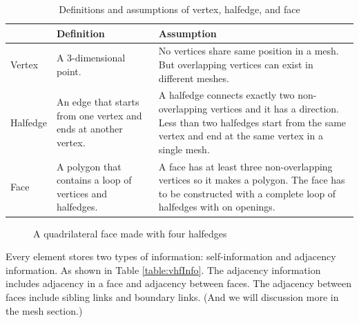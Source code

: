 \documentclass[12pt]{article}
\begin{document}
\begin{table}[h]
\centering
\begin{tabular}{| l | p{} | p{}|}

\hline
    & Definition  & Assumption  \\
\hline
Vertex  & A 3-dimensional point.    & No vertices share same position in a mesh. But overlapping vertices can exist in different meshes.\\
\hline
Halfedge  & An edge that starts from one vertex and ends at another vertex. & A halfedge connects exactly two non-overlapping vertices and it has a direction. 
Less than two halfedges start from the same vertex and end at the same vertex in a single mesh.\\
\hline
Face    & A polygon that contains a loop of vertices and halfedges. & A face has at least three non-overlapping vertices so it makes a polygon. The face has to be constructed with a complete loop of halfedges with on openings.\\
\hline
\end{tabular}
\caption{Definitions and assumptions of vertex, halfedge, and face} 
\label{table:vhfdef}
\end{table}

\begin{figure}[h]
  \centering
  \caption{A quadrilateral face made with four halfedges}
  \label{figure:singleFace}
\end{figure}

Every element stores two types of information: self-information and adjacency information. As shown in Table \ref{table:vhfInfo}. The adjacency information includes adjacency in a face and adjacency between faces. The adjacency between faces include sibling links and boundary links. (And we will discussion more in the mesh section.) 
\end{document}
